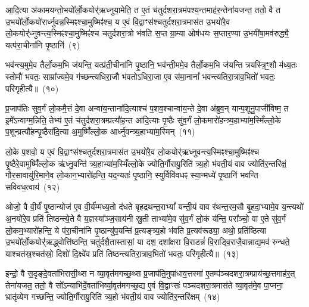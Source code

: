 {\anuvakamend[{वित॑ता॒ त्रिच॑त्वारिꣳशच्च}]}%

आ॒दि॒त्या अ॑कामयन्तो॒भयो᳚र्लो॒कयोर्॑ऋध्नुया॒मेति॒ त ए॒तं च॑तुर्दशरा॒त्रम॑पश्य॒न्तमाह॑र॒न्तेना॑यजन्त॒ ततो॒ वै त उ॒भयो᳚र्लो॒कयो॑रार्ध्नुवन्न॒स्मिꣴश्चा॒मुष्मिꣴ॑श्च॒ य ए॒वं वि॒द्वाꣳस॑श्चतुर्दशरा॒त्रमास॑त उ॒भयो॑रे॒व लो॒कयोर्॑\mbox{}॑ध्नुवन्त्य॒\-स्मिꣴश्चा॒मुष्मिꣴ॑श्च चतुर्दशरा॒त्रो भ॑वति स॒प्त ग्रा॒म्या ओष॑धयः स॒प्तार॒ण्या उ॒भयी॑षा॒मव॑रुद्ध्यै॒ यत्प॑रा॒चीना॑नि पृ॒ष्ठानि॑~(९)

भव॑न्त्य॒मुमे॒व तैर्लो॒कम॒भि ज॑यन्ति॒ यत्प्र॑ती॒चीना॑नि पृ॒ष्ठानि॒ भव॑न्ती॒ममे॒व तैर्लो॒कम॒भि ज॑यन्ति त्रयस्त्रि॒ꣳ॒शौ म॑ध्य॒तः स्तोमौ॑ भवतः॒ साम्रा᳚ज्यमे॒व ग॑च्छन्त्यधिरा॒जौ भ॑वतो\-ऽधिरा॒जा ए॒व स॑मा॒नानां᳚ भवन्त्यतिरा॒त्राव॒भितो॑ भवतः॒ परि॑गृहीत्यै॥~(१०)

{\anuvakamend[{पृ॒ष्ठानि॒ चतु॑स्त्रिꣳशच्च}]}%

प्र॒जा\-प॑तिः सुव॒र्गं लो॒कमै॒त्तं दे॒वा अन्वा॑य॒न्ताना॑दि॒त्याश्च॑ प॒शव॒श्चान्वा॑य॒न्ते दे॒वा अ॑ब्रुव॒न् यान्प॒शूनु॒पाजी॑विष्म॒ त इ॒मे᳚\-ऽन्वाग्म॒न्निति॒ तेभ्य॑ ए॒तं च॑तुर्दशरा॒त्रम्प्रत्यौ॑ह॒न्त आ॑दि॒त्याः पृ॒ष्ठैः सु॑व॒र्गं लो॒कमारो॑हन्त्र्य॒हाभ्या॑म॒स्मिँल्लो॒के प॒शून्प्रत्यौ॑हन्पृ॒ष्ठैरा॑दि॒त्या अ॒मुष्मिँ॑ल्लो॒क आर्ध्नु॑वन्त्र्य॒हाभ्या॑म॒स्मिन्~(११)

लो॒के प॒शवो॒ य ए॒वं वि॒द्वाꣳस॑श्चतुर्दशरा॒त्रमास॑त उ॒भयो॑रे॒व लो॒कयोर्॑ऋध्नुवन्त्य॒स्मिꣴश्चा॒मुष्मिꣴ॑श्च पृ॒ष्ठैरे॒वामुष्मिँ॑ल्लो॒क ऋ॑ध्नु॒वन्ति॑ त्र्य॒हाभ्या॑म॒स्मिँल्लो॒के ज्योति॒र्गौरायु॒रिति॑ त्र्य॒हो भ॑वती॒यं वाव ज्योति॑र॒न्तरि॑क्षं॒ गौर॒सावायु॑रि॒माने॒व लो॒कान॒भ्यारो॑हन्ति॒ यद॒न्यतः॑ पृ॒ष्ठानि॒ स्युर्विवि॑वधꣴ स्या॒न्मध्ये॑ पृ॒ष्ठानि॑ भवन्ति सविवध॒त्वाय॑~(१२)

ओजो॒ वै वी॒र्यं॑ पृ॒ष्ठान्योज॑ ए॒व वी॒र्य॑म्मध्य॒तो द॑धते बृहद्रथन्त॒रा\-भ्यां᳚ यन्ती॒यं वाव र॑थन्त॒रम॒सौ बृ॒हदा॒भ्यामे॒व य॒न्त्यथो॑ अ॒नयो॑रे॒व प्रति॑ तिष्ठन्त्ये॒ते वै य॒ज्ञस्या᳚ञ्ज॒साय॑नी स्रु॒ती ताभ्या॑मे॒व सु॑व॒र्गं लो॒कं य॑न्ति॒ परा᳚ञ्चो॒ वा ए॒ते सु॑व॒र्गं लो॒कम॒भ्यारो॑हन्ति॒ ये प॑रा॒चीना॑नि पृ॒ष्ठान्यु॑प॒यन्ति॑ प्र॒त्यङ्त्र्य॒हो भ॑वति प्र॒त्यव॑रूढ्या॒ अथो॒ प्रति॑ष्ठित्या उ॒भयो᳚र्लो॒कयोर्॑\mbox{}॑ऋद्ध्वोत्ति॑ष्ठन्ति॒ चतु॑र्दशै॒तास्तासां॒ या दश॒ दशा᳚क्षरा वि॒राडन्नं॑ वि॒राड्वि॒राजै॒वान्नाद्य॒मव॑ रुन्धते॒ याश्चत॑स्र॒श्चत॑स्रो॒ दिशो॑ दि॒क्ष्वे॑व प्रति॑ तिष्ठन्त्यतिरा॒त्राव॒भितो॑ भवतः॒ परि॑गृहीत्यै॥~(१३)

{\anuvakamend[{आर्ध्नु॑वन्त्र्य॒हाभ्या॑म॒स्मिन्थ्स॑विवध॒त्वाय॒ प्रति॑ष्ठित्या॒ एक॑त्रिꣳशच्च}]}%

इन्द्रो॒ वै स॒दृङ्दे॒वता॑भिरासी॒थ्स न व्या॒वृत॑मगच्छ॒थ्स प्र॒जा\-प॑ति॒मुपा॑धाव॒त्तस्मा॑ ए॒तम्प॑ञ्चदशरा॒त्रम्प्राय॑च्छ॒त्तमाह॑र॒त् तेना॑यजत॒ ततो॒ वै सो᳚\-ऽन्याभि॑र्दे॒वता॑भिर्व्या॒वृत॑मगच्छ॒द्य ए॒वं वि॒द्वाꣳसः॑ पञ्चदशरा॒त्रमास॑ते व्या॒वृत॑मे॒व पा॒प्मना॒ भ्रातृ॑व्येण गच्छन्ति॒ ज्योति॒र्गौरायु॒रिति॑ त्र्य॒हो भ॑वती॒यं वाव ज्योति॑र॒न्तरि॑क्षम्~(१४)

